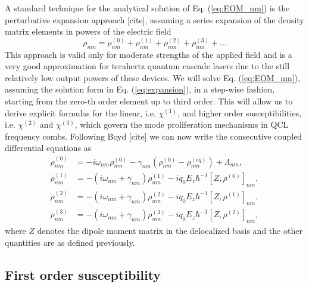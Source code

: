\documentclass[preprint,secnumarabic,amssymb, nobibnotes, aip, prd]{revtex4-1}
\begin{document}
	
	A standard technique for the analytical solution of Eq. (\ref{eq:EOM_nm}) is the perturbative expansion approach [cite], assuming a series expansion of the density matrix elements in powers of the electric field
	\begin{equation}
	\label{eq:expansion}
	\rho_{nm} = \rho_{nm}^{(0)}+\rho_{nm}^{(1)}+\rho_{nm}^{(2)} +\rho_{nm}^{(3)} + ...
	\end{equation} 
	This approach is valid only for moderate strengths of the applied field and is a very good approximation for terahertz quantum cascade lasers due to the still relatively low output powers of these devices. We will solve Eq. (\ref{eq:EOM_nm}), assuming the solution form in Eq. (\ref{eq:expansion}), in a step-wise fashion, starting from the zero-th order element up to third order. This will allow us to derive explicit formulas for the linear, i.e. $\chi^{(1)}$, and higher order susceptibilities, i.e. $\chi^{(2)}$ and $\chi^{(3)}$, which govern the mode proliferation mechanisms in QCL frequency combs. Following Boyd [cite] we can now write the consecutive coupled differential equations as 
	\begin{subequations}
		\label{eq:EOM_expansion_nm}
		\begin{align}
		\dot{\rho}_{nm}^{(0)} &= -i\omega_{nm}\rho_{nm}^{(0)} -\gamma_{nm}(\rho_{nm}^{(0)}-\rho_{nm}^{(eq)}) + \Lambda_{nm}, \label{eq:EOM_zeroth}\\
		\dot{\rho}_{nm}^{(1)} &= -(i\omega_{nm}+\gamma_{nm})\rho_{nm}^{(1)}  - i q_0E_z\hbar^{-1}[Z,\rho^{(0)}]_{nm}, \label{eq:EOM_first}\\
		\dot{\rho}_{nm}^{(2)} &= -(i\omega_{nm}+\gamma_{nm})\rho_{nm}^{(2)}  - i q_0E_z\hbar^{-1}[Z,\rho^{(1)}]_{nm},  \label{eq:EOM_second}\\
		\dot{\rho}_{nm}^{(3)} &= -(i\omega_{nm}+\gamma_{nm})\rho_{nm}^{(3)}  - i q_0E_z\hbar^{-1}[Z,\rho^{(2)}]_{nm},  \label{eq:EOM_third}
		\end{align} 
	\end{subequations}
	where $Z$ denotes the dipole moment matrix in the delocalized basis and the other quantities are as defined previously.  
	
	\subsection{First order susceptibility}
	
\end{document}
